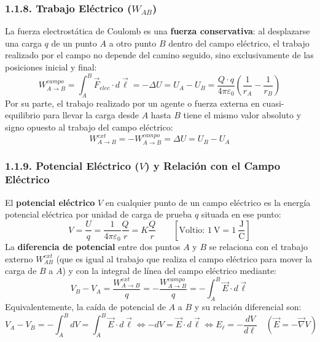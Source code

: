 \subsubsection{1.1.8. Trabajo Eléctrico ($W_{AB}$)}
La fuerza electrostática de Coulomb es una \textbf{fuerza conservativa}: al desplazarse una carga $q$ de un punto $A$ a otro punto $B$ dentro del campo eléctrico, el trabajo realizado por el campo no depende del camino seguido, sino exclusivamente de las posiciones inicial y final:
\begin{equation}
    W_{A \to B}^{campo} = \int_A^B \vec{F}_{elec} \cdot d\vec{\ell} = -\Delta U = U_A - U_B = \frac{Q \cdot q}{4\pi\varepsilon_0} \left(\frac{1}{r_A} - \frac{1}{r_B}\right)
\end{equation}
Por su parte, el trabajo realizado por un agente o fuerza externa en cuasi-equilibrio para llevar la carga desde $A$ hasta $B$ tiene el mismo valor absoluto y signo opuesto al trabajo del campo eléctrico:
\begin{equation}
    W_{A \to B}^{ext} = -W_{A \to B}^{campo} = \Delta U = U_B - U_A
\end{equation}

\subsubsection{1.1.9. Potencial Eléctrico ($V$) y Relación con el Campo Eléctrico}
\begin{definicion}
El \textbf{potencial eléctrico} $V$ en cualquier punto de un campo eléctrico es la energía potencial eléctrica por unidad de carga de prueba $q$ situada en ese punto:
\begin{equation}
    V = \frac{U}{q} = \frac{1}{4\pi\varepsilon_0} \frac{Q}{r} = K \frac{Q}{r} \qquad \left[\text{Voltio: } 1\ \si{\volt} = 1\ \frac{\si{\joule}}{\si{\coulomb}}\right]
\end{equation}
La \textbf{diferencia de potencial} entre dos puntos $A$ y $B$ se relaciona con el trabajo externo $W_{AB}^{ext}$ (que es igual al trabajo que realiza el campo eléctrico para mover la carga de $B$ a $A$) y con la integral de línea del campo eléctrico mediante:
\begin{equation}
    V_B - V_A = \frac{W_{A \to B}^{ext}}{q} = -\frac{W_{A \to B}^{campo}}{q} = -\int_A^B \vec{E} \cdot d\vec{\ell}
\end{equation}
Equivalentemente, la caída de potencial de $A$ a $B$ y su relación diferencial son:
\begin{equation}
    \boxed{V_A - V_B = -\int_A^B dV = \int_A^B \vec{E} \cdot d\vec{\ell} \iff -dV = \vec{E} \cdot d\vec{\ell} \iff E_\ell = -\frac{dV}{d\ell} \quad (\vec{E} = -\vec{\nabla} V)}
\end{equation}
\end{definicion}

